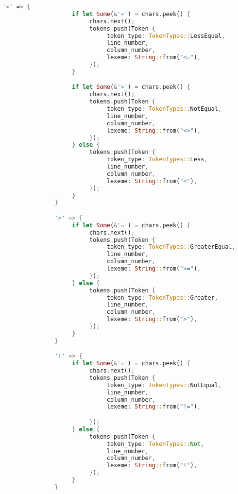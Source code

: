 \documentclass[12pt]{article}
\begin{document}
{\begin{lstlisting}[language=Rust]
               '<' => {
                    if let Some(&'=') = chars.peek() {
                         chars.next();
                         tokens.push(Token {
                              token_type: TokenTypes::LessEqual,
                              line_number,
                              column_number,
                              lexeme: String::from("<="),
                         });
                    } 

                    if let Some(&'>') = chars.peek() {
                         chars.next();
                         tokens.push(Token {
                              token_type: TokenTypes::NotEqual,
                              line_number,
                              column_number,
                              lexeme: String::from("<>"),
                         });
                    } else {
                         tokens.push(Token {
                              token_type: TokenTypes::Less,
                              line_number,
                              column_number,
                              lexeme: String::from("<"),
                         });
                    }
               }

               '>' => {
                    if let Some(&'=') = chars.peek() {
                         chars.next();
                         tokens.push(Token {
                              token_type: TokenTypes::GreaterEqual,
                              line_number,
                              column_number,
                              lexeme: String::from(">="),
                         });
                    } else {
                         tokens.push(Token {
                              token_type: TokenTypes::Greater,
                              line_number,
                              column_number,
                              lexeme: String::from(">"),
                         });
                    }
               }

               '!' => {
                    if let Some(&'=') = chars.peek() {
                         chars.next();
                         tokens.push(Token {
                              token_type: TokenTypes::NotEqual,
                              line_number,
                              column_number,
                              lexeme: String::from("!="),

                         });
                    } else {
                         tokens.push(Token {
                              token_type: TokenTypes::Not,
                              line_number,
                              column_number,
                              lexeme: String::from("!"),
                         });
                    }
               }


\end{lstlisting}}
\end{document}
